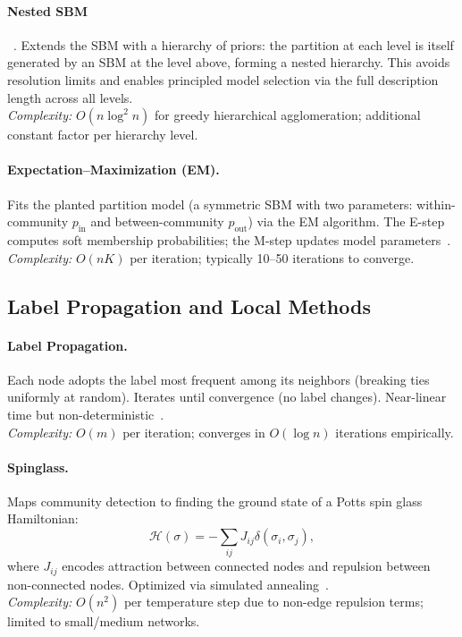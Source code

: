 \documentclass[11pt]{article}
\begin{document}
\paragraph{Nested SBM}~\citep{tiago_p__peixoto_7fc46d1a}.
Extends the SBM with a hierarchy of priors: the partition at each level is itself generated by an SBM at the level above, forming a nested hierarchy. This avoids resolution limits and enables principled model selection via the full description length across all levels.\\
\emph{Complexity:} $O(n\log^2 n)$ for greedy hierarchical agglomeration; additional constant factor per hierarchy level.

\paragraph{Expectation--Maximization (EM).}
Fits the planted partition model (a symmetric SBM with two parameters: within-community $p_\text{in}$ and between-community $p_\text{out}$) via the EM algorithm. The E-step computes soft membership probabilities; the M-step updates model parameters~\citep{santo_fortunato_93a74814}.\\
\emph{Complexity:} $O(nK)$ per iteration; typically 10--50 iterations to converge.

\subsection{Label Propagation and Local Methods}

\paragraph{Label Propagation.}
Each node adopts the label most frequent among its neighbors (breaking ties uniformly at random). Iterates until convergence (no label changes). Near-linear time but non-deterministic~\citep{santo_fortunato_93a74814}.\\
\emph{Complexity:} $O(m)$ per iteration; converges in $O(\log n)$ iterations empirically.

\paragraph{Spinglass.}
Maps community detection to finding the ground state of a Potts spin glass Hamiltonian:
\[
\mathcal{H}(\sigma) = -\sum_{ij} J_{ij}\delta(\sigma_i, \sigma_j),
\]
where $J_{ij}$ encodes attraction between connected nodes and repulsion between non-connected nodes. Optimized via simulated annealing~\citep{santo_fortunato_93a74814}.\\
\emph{Complexity:} $O(n^2)$ per temperature step due to non-edge repulsion terms; limited to small/medium networks.
\end{document}
